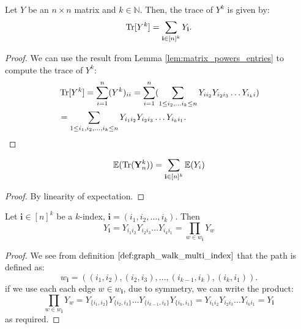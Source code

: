 \begin{lemma}
  \label{lem:matrix_powers_trace}
  Let $Y$ be an $n\times n$ matrix and $k \in \mathbb{N}$. Then, the trace of $Y^{k}$ is given by:
  $$
  \operatorname{Tr}[Y^{k}] = \sum_{\mathbf{i} \in [n]^k} Y_{\mathbf{i}}.
  $$
\end{lemma}

\begin{proof}
  We can use the result from Lemma \ref{lem:matrix_powers_entries} to compute the trace of $Y^k$:
  \begin{align*}
  &\operatorname{Tr}[Y^{k}] = \sum_{i=1}^{n} (Y^{k})_{ii} = \sum_{i=1}^{n} (\sum_{1\leq i_{2}, \ldots i_{k} \leq n} Y_{i i_{2}} Y_{i_{2}i_{3}} \ldots Y_{i_{k} i}) \\
  &= \sum_{1\leq i_{1}, i_{2}, \ldots, i_{k} \leq n} Y_{i_{1} i_{2}} Y_{i_{2} i_{3}} \ldots Y_{i_{k} i_{1}}.
\end{align*}

\end{proof}


\begin{lemma}
    \label{lem:trace_expectation_of_matrix}
    $$
    \mathbb{E}(\operatorname{Tr}(\mathbf{Y}_{n}^{k})) = \sum_{\mathbf{i} \in [n]^{k}} \mathbb{E}(Y_{i})
    $$
\end{lemma}

\begin{proof}
  By linearity of expectation.
\end{proof}


\begin{lemma}
    \label{lem:multi_index_graph_equivalence}
    Let $\mathbf{i} \in [n]^k$ be a $k$-index, $\mathbf{i}=\left(i_1, i_2, \ldots, i_k\right)$. Then
     $$
     Y_{\mathbf{i}} = Y_{i_{1}i_{2}} Y_{i_{2}i_{3}} \ldots Y_{i_{k}i_{1}} = \prod_{w \in w_{\mathbf{i}}} Y_{w}
    $$
\end{lemma}

\begin{proof}
    We see from definition $\ref{def:graph_walk_multi_index}$ that the path is defined as:
    $$
    w_{\mathbf{i}} = ((i_1, i_2),(i_2, i_3), \ldots,(i_{k-1}, i_k),(i_k, i_1)).
    $$
    if we use each each edge $w \in w_{\mathbf{i}}$, due to symmetry, we can write the product:
    $$
    \prod_{w\in w_{\mathbf{i}}} Y_{w} = Y_{\{i_{1}, i_{2}\}} Y_{\{i_{2}, i_{3}\}} \ldots Y_{\{i_{k-1}, i_{k}\}} Y_{\{i_{k}, i_{1}\}} = Y_{i_{1}i_{2}} Y_{i_{2}i_{3}} \ldots Y_{i_{k}i_{1}} = Y_{\mathbf{i}}
    $$
    as required.
\end{proof}


